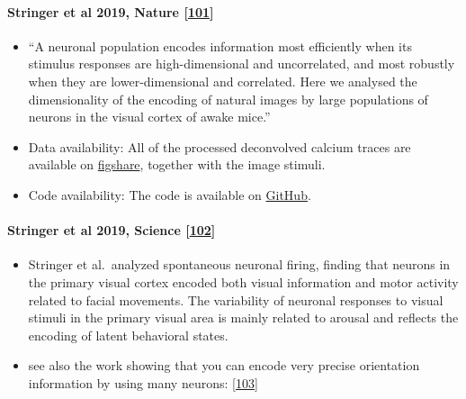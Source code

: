 \hypertarget{stringer-et-al-2019-nature-stringer2019nature}{%
\paragraph{\texorpdfstring{Stringer et al 2019, Nature {[}\protect\hyperlink{ref-brg2FFsb}{101}{]}}{Stringer et al 2019, Nature {[}101{]}}}\label{stringer-et-al-2019-nature-stringer2019nature}}

\begin{itemize}
\tightlist
\item
  ``A neuronal population encodes information most efficiently when its stimulus responses are high-dimensional and uncorrelated, and most robustly when they are lower-dimensional and correlated. Here we analysed the dimensionality of the encoding of natural images by large populations of neurons in the visual cortex of awake mice.''
\item
  Data availability: All of the processed deconvolved calcium traces are available on \href{https://figshare.com/articles/Recordings_of_ten_thousand_neurons_in_visual_cortex_in_response_to_2_800_natural_images/6845348}{figshare}, together with the image stimuli.
\item
  Code availability: The code is available on \href{https://github.com/MouseLand/stringer-pachitariu-et-al-2018b}{GitHub}.
\end{itemize}

\hypertarget{stringer-et-al-2019-science-stringer2019science}{%
\paragraph{\texorpdfstring{Stringer et al 2019, Science {[}\protect\hyperlink{ref-1BPHUQLTf}{102}{]}}{Stringer et al 2019, Science {[}102{]}}}\label{stringer-et-al-2019-science-stringer2019science}}

\begin{itemize}
\item
  Stringer et al.~analyzed spontaneous neuronal firing, finding that neurons in the primary visual cortex encoded both visual information and motor activity related to facial movements. The variability of neuronal responses to visual stimuli in the primary visual area is mainly related to arousal and reflects the encoding of latent behavioral states.
\item
  see also the work showing that you can encode very precise orientation information by using many neurons: {[}\protect\hyperlink{ref-1EMs3GS0B}{103}{]}
\end{itemize}

